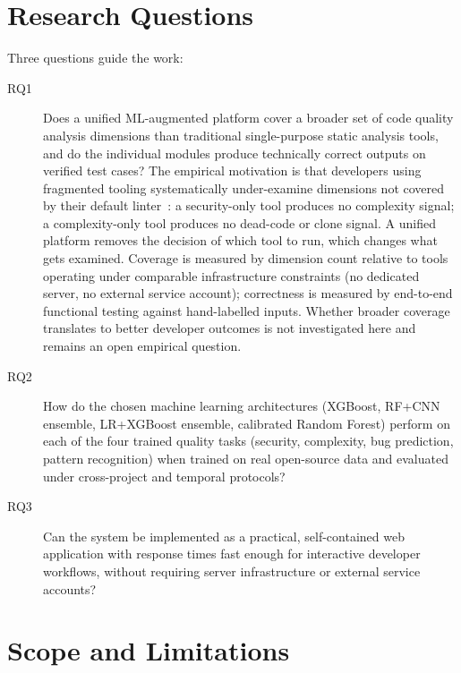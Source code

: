 \documentclass[12pt, oneside]{report}
\begin{document}
\section{Research Questions}
\label{sec:rq}

Three questions guide the work:

\begin{description}
  \item[RQ1] Does a unified ML-augmented platform cover a broader set of code
    quality analysis dimensions than traditional single-purpose static analysis
    tools, and do the individual modules produce technically correct outputs on
    verified test cases? The empirical motivation is that developers using fragmented
    tooling systematically under-examine dimensions not covered by their default
    linter~\cite{johnson2013}: a security-only tool produces no complexity signal;
    a complexity-only tool produces no dead-code or clone signal. A unified platform
    removes the decision of which tool to run, which changes what gets examined.
    Coverage is measured by dimension count relative to tools operating under comparable infrastructure constraints (no dedicated server, no external service account); correctness is measured by end-to-end functional testing against hand-labelled inputs.
    Whether broader coverage translates to better developer outcomes is not
    investigated here and remains an open empirical question.
  \item[RQ2] How do the chosen machine learning architectures (XGBoost, RF+CNN
    ensemble, LR+XGBoost ensemble, calibrated Random Forest) perform on each of the
    four trained quality tasks (security, complexity, bug prediction, pattern
    recognition) when trained on real open-source data and evaluated under
    cross-project and temporal protocols?
  \item[RQ3] Can the system be implemented as a practical, self-contained web
    application with response times fast enough for interactive developer workflows,
    without requiring server infrastructure or external service accounts?
\end{description}

\section{Scope and Limitations}
\label{sec:scope}
\end{document}
